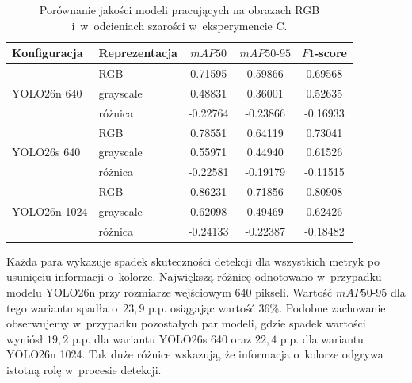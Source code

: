 \begin{table}[ht]
    \centering
    \caption{Porównanie jakości modeli pracujących na obrazach RGB i~w~odcieniach szarości w~eksperymencie C.}
    \label{tab:exp_c}
    \begin{tabular}{l|l|ccc}
        \toprule
        \textbf{Konfiguracja}      &
        \textbf{Reprezentacja}     &
        \textbf{$mAP50$}           &
        \textbf{$mAP50\text{-}95$} &
        \textbf{$F1$-score}                                          \\
        \midrule

        \multirow{3}{*}{YOLO26n 640}
                                   & RGB
                                   & 0.71595   & 0.59866  & 0.69568  \\
                                   & grayscale
                                   & 0.48831   & 0.36001  & 0.52635  \\
                                   & różnica
                                   & -0.22764  & -0.23866 & -0.16933 \\
        \midrule

        \multirow{3}{*}{YOLO26s 640}
                                   & RGB
                                   & 0.78551   & 0.64119  & 0.73041  \\
                                   & grayscale
                                   & 0.55971   & 0.44940  & 0.61526  \\
                                   & różnica
                                   & -0.22581  & -0.19179 & -0.11515 \\
        \midrule

        \multirow{3}{*}{YOLO26n 1024}
                                   & RGB
                                   & 0.86231   & 0.71856  & 0.80908  \\
                                   & grayscale
                                   & 0.62098   & 0.49469  & 0.62426  \\
                                   & różnica
                                   & -0.24133  & -0.22387 & -0.18482 \\
        \bottomrule
    \end{tabular}
\end{table}


Każda para wykazuje spadek skuteczności detekcji dla wszystkich metryk po usunięciu informacji o~kolorze. Największą różnicę odnotowano w~przypadku modelu YOLO26n przy rozmiarze wejściowym 640 pikseli. Wartość $mAP50\text{-}95$ dla tego wariantu spadła o~$23,9$ p.p. osiągając wartość $36\%$. Podobne zachowanie obserwujemy w~przypadku pozostałych par modeli, gdzie spadek wartości wyniósł $19,2$ p.p. dla wariantu YOLO26s 640 oraz $22,4$ p.p. dla wariantu YOLO26n 1024. Tak duże różnice wskazują, że informacja o~kolorze odgrywa istotną rolę w~procesie detekcji.

